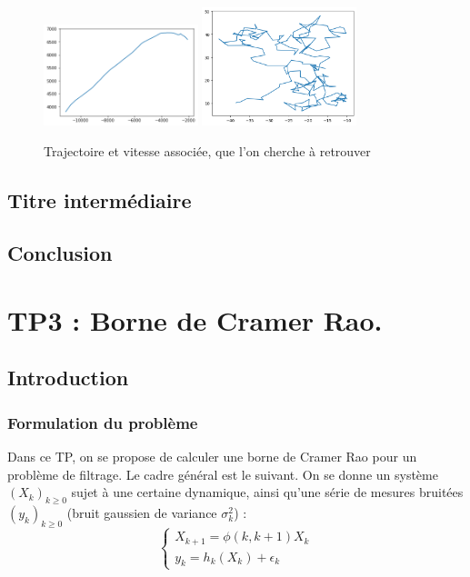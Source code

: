 \documentclass{article}
\begin{document}
\begin{figure}[ht]
\centering
\includegraphics[width=0.4\textwidth]{TP2/position_réelle.png}
\includegraphics[width=0.4\textwidth]{TP2/vitesse_reelle.png}
\caption{Trajectoire et vitesse associée, que l'on cherche à retrouver}
\label{TP2_pos_vit}
\end{figure}

\subsection{Titre intermédiaire}
\subsection{Conclusion}


\newpage

\section{TP3 : Borne de Cramer Rao.}
\subsection{Introduction}
\subsubsection{Formulation du problème}

Dans ce TP, on se propose de calculer une borne de Cramer Rao pour un problème de filtrage. Le cadre général est le suivant.
On se donne un système  $(X_{k})_{k\geq 0}$ sujet à une certaine dynamique,
ainsi qu'une série de mesures bruitées $(y_{k})_{k \geq 0}$ (bruit gaussien de variance $\sigma_{k}^{2}$) : 
\[\left\{\begin{array}{ll}
   X_{k+1} = \phi(k,k+1)X_{k} \\
   y_{k}=h_{k}(X_{k})+\epsilon_{k}
\end{array}\right. \]
\end{document}

